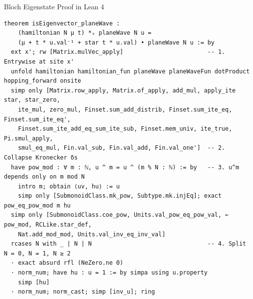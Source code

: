 \documentclass[aspectratio=169, 10pt]{beamer}
\begin{document}
\begin{frame}[fragile]{Bloch Eigenstate Proof in Lean 4}
\begin{lstlisting}[language=Lean4]
theorem isEigenvector_planeWave :
    (hamiltonian N μ t) *ᵥ planeWave N u =
    (μ + t * u.val⁻¹ + star t * u.val) • planeWave N u := by
  ext x'; rw [Matrix.mulVec_apply]                        -- 1. Entrywise at site x'
  unfold hamiltonian hamiltonian_fun planeWave planeWaveFun dotProduct hopping_forward onsite
  simp only [Matrix.row_apply, Matrix.of_apply, add_mul, apply_ite star, star_zero,
    ite_mul, zero_mul, Finset.sum_add_distrib, Finset.sum_ite_eq, Finset.sum_ite_eq',
    Finset.sum_ite_add_eq_sum_ite_sub, Finset.mem_univ, ite_true, Pi.smul_apply,
    smul_eq_mul, Fin.val_sub, Fin.val_add, Fin.val_one']  -- 2. Collapse Kronecker δs
  have pow_mod : ∀ m : ℕ, u ^ m = u ^ (m % N : ℕ) := by   -- 3. u^m depends only on m mod N
    intro m; obtain ⟨uv, hu⟩ := u
    simp only [SubmonoidClass.mk_pow, Subtype.mk.injEq]; exact pow_eq_pow_mod m hu
  simp only [SubmonoidClass.coe_pow, Units.val_pow_eq_pow_val, ← pow_mod, RCLike.star_def,
    Nat.add_mod_mod, Units.val_inv_eq_inv_val]
  rcases N with _ | N | N                                 -- 4. Split N = 0, N = 1, N ≥ 2
  · exact absurd rfl (NeZero.ne 0)
  · norm_num; have hu : u = 1 := by simpa using u.property
    simp [hu]
  · norm_num; norm_cast; simp [inv_u]; ring
\end{lstlisting}
\end{frame}
\end{document}
